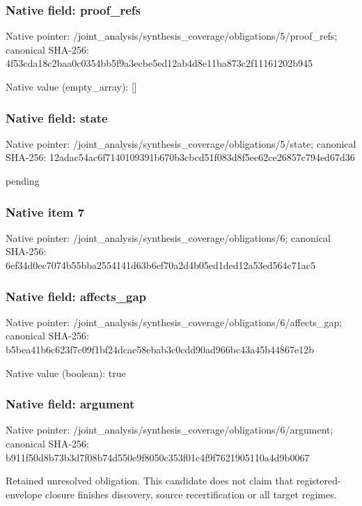 \documentclass[10pt,a4paper]{article}
\begin{document}
\subsubsection{Native field: proof\_\allowbreak{}refs}
Native pointer: /joint\_\allowbreak{}analysis/synthesis\_\allowbreak{}coverage/obligations/5/proof\_\allowbreak{}refs; canonical SHA-256: 4f53cda18c2baa0c0354bb5f9a3ecbe5ed12ab4d8e11ba873c2f11161202b945

Native value (empty\_\allowbreak{}array): []

\subsubsection{Native field: state}
Native pointer: /joint\_\allowbreak{}analysis/synthesis\_\allowbreak{}coverage/obligations/5/state; canonical SHA-256: 12adac54ac6f7140109391b670b3cbcd51f083d8f5ee62ce26857c794ed67d36

\begingroup\raggedright\sloppy pending\par\endgroup

\subsubsection{Native item 7}
Native pointer: /joint\_\allowbreak{}analysis/synthesis\_\allowbreak{}coverage/obligations/6; canonical SHA-256: 6ef34d0ec7074b55bba2554141d63b6ef70a2d4b05ed1ded12a53ed564c71ac5

\subsubsection{Native field: affects\_\allowbreak{}gap}
Native pointer: /joint\_\allowbreak{}analysis/synthesis\_\allowbreak{}coverage/obligations/6/affects\_\allowbreak{}gap; canonical SHA-256: b5bea41b6c623f7c09f1bf24dcae58ebab3c0cdd90ad966bc43a45b44867e12b

Native value (boolean): true

\subsubsection{Native field: argument}
Native pointer: /joint\_\allowbreak{}analysis/synthesis\_\allowbreak{}coverage/obligations/6/argument; canonical SHA-256: b911f50d8b73b3d7f08b74d550e9f8050c353f01c4f9f7621905110a4d9b0067

\begingroup\raggedright\sloppy Retained unresolved obligation. This candidate does not claim that registered-envelope closure finishes discovery,\allowbreak{} source recertification or all target regimes.\par\endgroup
\end{document}
